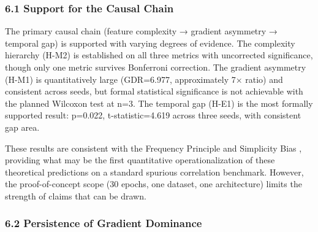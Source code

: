 
\subsubsection{6.1 Support for the Causal Chain}

The primary causal chain (feature complexity → gradient asymmetry → temporal gap) is supported with varying degrees of evidence. The complexity hierarchy (H-M2) is established on all three metrics with uncorrected significance, though only one metric survives Bonferroni correction. The gradient asymmetry (H-M1) is quantitatively large (GDR=6.977, approximately 7× ratio) and consistent across seeds, but formal statistical significance is not achievable with the planned Wilcoxon test at n=3. The temporal gap (H-E1) is the most formally supported result: p=0.022, t-statistic=4.619 across three seeds, with consistent gap area.

These results are consistent with the Frequency Principle \citep{Xuetal2019} and Simplicity Bias \citep{Shahetal2020}, providing what may be the first quantitative operationalization of these theoretical predictions on a standard spurious correlation benchmark. However, the proof-of-concept scope (30 epochs, one dataset, one architecture) limits the strength of claims that can be drawn.

\subsubsection{6.2 Persistence of Gradient Dominance}

